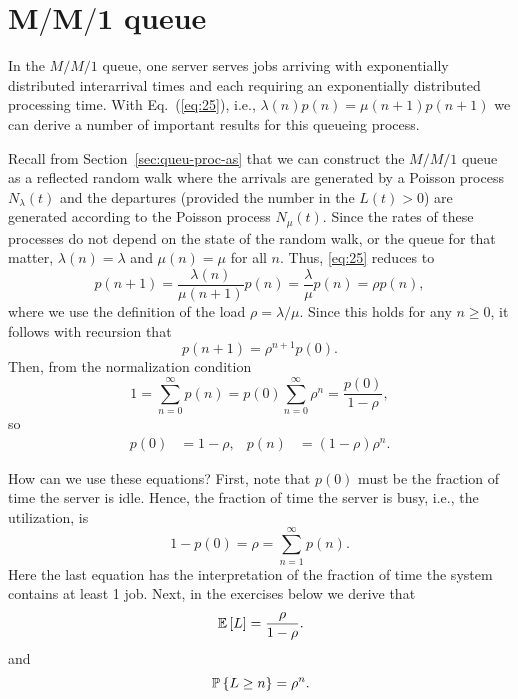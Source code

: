 \section
[$M/M/1$ queue]
{$\mathbf{M/M/1}$ queue}
\label{sec:mm1}

In the $M/M/1$ queue, one server serves jobs arriving with
exponentially distributed interarrival times and each requiring an
exponentially distributed processing time.  With Eq.~(\ref{eq:25}),
i.e., $\lambda(n)p(n)= \mu(n+1)p(n+1)$ we can derive a number of
important results for this queueing process.

Recall from Section~\ref{sec:queu-proc-as} that we can construct the
$M/M/1$ queue as a reflected random walk where the arrivals are
generated by a Poisson process $N_\lambda(t)$ and the departures
(provided the number in the $L(t)>0$) are generated according to the
Poisson process $N_\mu(t)$. Since the rates of these processes do not
depend on the state of the random walk, or the queue for that matter,
$\lambda(n)=\lambda$ and $\mu(n)=\mu$ for all $n$. Thus, \eqref{eq:25}
reduces to
\begin{equation*}
  p(n+1) = \frac{\lambda(n)}{\mu(n+1)} p(n) = \frac{\lambda}{\mu} p(n) = \rho p(n),
\end{equation*}
where we use the definition of the load $\rho=\lambda/\mu$. Since this
holds for any $n\geq 0$, it follows with recursion that
\begin{equation*}
  p(n+1) = \rho^{n+1} p(0).
\end{equation*}
Then, from the normalization condition
\begin{equation*}
1=  \sum_{n=0}^\infty p(n) = p(0)\sum_{n=0}^\infty \rho^n = \frac{p(0)}{1-\rho},
\end{equation*}
so 
\begin{align}\label{eq:23}
p(0) &=1-\rho, &   p(n) &=  (1-\rho)\rho^{n}.
\end{align}

How can we use these equations? First, note that $p(0)$ must be the
fraction of time the server is idle. Hence, the fraction of time the
server is busy, i.e., the utilization, is
\begin{equation*}
  1-p(0) = \rho = \sum_{n=1}^\infty p(n).
\end{equation*}
Here the last equation has the interpretation of the fraction of time
the system contains at least 1 job. Next, in the exercises below we
derive that
\begin{equation}\label{eq:el}
  \E L = \frac \rho{1-\rho}.
\end{equation}
and 
\begin{equation}\label{eq:pn}
  \P{L\geq n} = \rho^n.
\end{equation}

